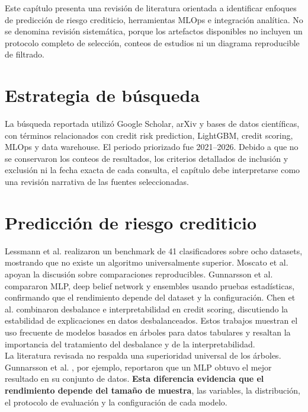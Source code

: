 Este capítulo presenta una revisión de literatura orientada a identificar enfoques de predicción de riesgo crediticio, herramientas MLOps e integración analítica. No se denomina revisión sistemática, porque los artefactos disponibles no incluyen un protocolo completo de selección, conteos de estudios ni un diagrama reproducible de filtrado.

\section{Estrategia de búsqueda}

La búsqueda reportada utilizó Google Scholar, arXiv y bases de datos científicas, con términos relacionados con credit risk prediction, LightGBM, credit scoring, MLOps y data warehouse. El periodo priorizado fue 2021--2026. Debido a que no se conservaron los conteos de resultados, los criterios detallados de inclusión y exclusión ni la fecha exacta de cada consulta, el capítulo debe interpretarse como una revisión narrativa de las fuentes seleccionadas.

\section{Predicción de riesgo crediticio}

Lessmann et al. \cite{lessmann2015benchmarking} realizaron un benchmark de 41 clasificadores sobre ocho datasets, mostrando que no existe un algoritmo universalmente superior. Moscato et al. \cite{moscato2021benchmark} apoyan la discusión sobre comparaciones reproducibles. Gunnarsson et al. \cite{gunnarsson2021deep} compararon MLP, deep belief network y ensembles usando pruebas estadísticas, confirmando que el rendimiento depende del dataset y la configuración. Chen et al. \cite{chen2024interpretable} combinaron desbalance e interpretabilidad en credit scoring, discutiendo la estabilidad de explicaciones en datos desbalanceados. Estos trabajos muestran el uso frecuente de modelos basados en árboles para datos tabulares y resaltan la importancia del tratamiento del desbalance y de la interpretabilidad.\\

La literatura revisada no respalda una superioridad universal de los árboles. Gunnarsson et al. \cite{gunnarsson2021deep}, por ejemplo, reportaron que un MLP obtuvo el mejor resultado en su conjunto de datos. \textbf{Esta diferencia evidencia que el rendimiento depende del tamaño de muestra}, las variables, la distribución, el protocolo de evaluación y la configuración de cada modelo.\\

